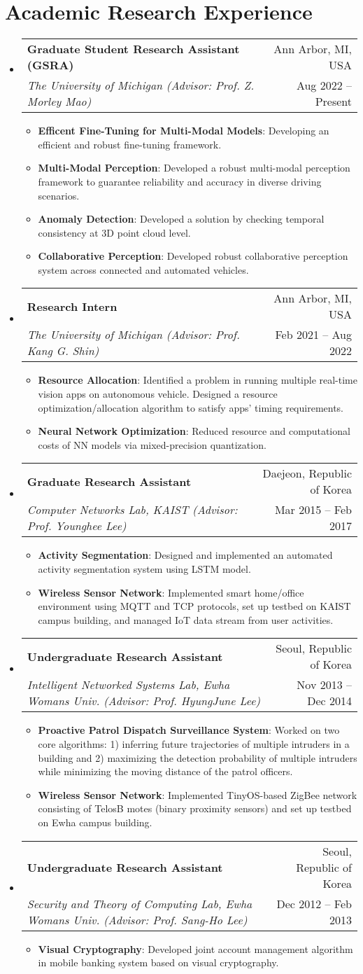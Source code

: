 \documentclass[letterpaper,oneside,11pt]{article}
\makeatletter
\newcommand{\resumeItem}[2]{
  \item\small{
    \textbf{#1}{: #2 \vspace{-2pt}}
  }
}
\newcommand{\resumeSubheading}[4]{
  \vspace{-2pt}\item
    \begin{tabularx}{0.97\textwidth}[t]{X@{\hspace{-5pt}}r}
      \textbf{#1} & #2 \\
      \textit{\small#3} & \small #4 \\
    \end{tabularx}\vspace{-6pt}
}
\newcommand{\resumeSubHeadingListStart}{\begin{itemize}[leftmargin=*]}
\newcommand{\resumeSubHeadingListEnd}{\end{itemize}}
\newcommand{\resumeItemListStart}{\begin{itemize}}
\newcommand{\resumeItemListEnd}{\end{itemize}\vspace{-5pt}}
\makeatother
\begin{document}
\section{Academic Research Experience}
  \resumeSubHeadingListStart
    \resumeSubheading
    {Graduate Student Research Assistant (GSRA)}{Ann Arbor, MI, USA}
    {The University of Michigan (Advisor: Prof. Z. Morley Mao)}{Aug 2022 -- Present}
    \resumeItemListStart
      \resumeItem{Efficent Fine-Tuning for Multi-Modal Models}{Developing an efficient and robust fine-tuning framework.}
      \resumeItem{Multi-Modal Perception}{Developed a robust multi-modal perception framework to guarantee reliability and accuracy in diverse driving scenarios.}
      \resumeItem{Anomaly Detection}{Developed a solution by checking temporal consistency at 3D point cloud level.}
      \resumeItem{Collaborative Perception}{Developed robust collaborative perception system across connected and automated vehicles.}
    \resumeItemListEnd
    \resumeSubheading
      {Research Intern}{Ann Arbor, MI, USA}
      {The University of Michigan (Advisor: Prof. Kang G. Shin)}{Feb 2021 -- Aug 2022}
      \resumeItemListStart
        \resumeItem{Resource Allocation}{Identified a problem in running multiple real-time vision apps on autonomous vehicle. Designed a resource optimization/allocation algorithm to satisfy apps' timing requirements.}
        \resumeItem{Neural Network Optimization}{Reduced resource and computational costs of NN models via mixed-precision quantization.}
      \resumeItemListEnd
    \resumeSubheading
      {Graduate Research Assistant}{Daejeon, Republic of Korea}
      {Computer Networks Lab, KAIST (Advisor: Prof. Younghee Lee)}{Mar 2015 -- Feb 2017}
      \resumeItemListStart
        \resumeItem{Activity Segmentation}{Designed and implemented an automated activity segmentation system using LSTM model.}
        \resumeItem{Wireless Sensor Network}{Implemented smart home/office environment using MQTT and TCP protocols, set up testbed on KAIST campus building, and managed IoT data stream from user activities.}
      \resumeItemListEnd
    \resumeSubheading
      {Undergraduate Research Assistant}{Seoul, Republic of Korea}
      {Intelligent Networked Systems Lab, Ewha Womans Univ. (Advisor: Prof. HyungJune Lee)}{Nov 2013 -- Dec 2014}
      \resumeItemListStart   
        \resumeItem{Proactive Patrol Dispatch Surveillance System}{Worked on two core algorithms: 1) inferring future trajectories of multiple intruders in a building and 2) maximizing the detection probability of multiple intruders while minimizing the moving distance of the patrol officers.}
        \resumeItem{Wireless Sensor Network}{Implemented TinyOS-based ZigBee network consisting of TelosB motes (binary proximity sensors) and set up testbed on Ewha campus building.}
      \resumeItemListEnd
    \resumeSubheading
      {Undergraduate Research Assistant}{Seoul, Republic of Korea}
      {Security and Theory of Computing Lab, Ewha Womans Univ. (Advisor: Prof. Sang-Ho Lee)}{Dec 2012 -- Feb 2013}
      \resumeItemListStart
        \resumeItem{Visual Cryptography}{Developed joint account management algorithm in mobile banking system based on visual cryptography.}
      \resumeItemListEnd
  \resumeSubHeadingListEnd
\end{document}
